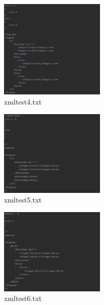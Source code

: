 \documentclass{article}
\begin{document}
\begin{multicols}{2}
					
					\begin{figure}[H]
					\centering
			 			\includegraphics[width=0.45\textwidth]{xmltest4.png}
			 			\centering
			  			\caption{xmltest4.txt}
			  			\label{fig:xmltest4}
					\end{figure}
					
					\begin{figure}[H]
					\centering
			 			\includegraphics[width=0.45\textwidth]{xmltest5.png}
			 			\centering
			  			\caption{xmltest5.txt}
			  			\label{fig:xmltest5}
					\end{figure}
					\begin{figure}[H]
					\centering
			 			\includegraphics[width=0.45\textwidth]{xmltest6.png}
			 			\centering
			  			\caption{xmltest6.txt}
			  			\label{fig:xmltest6}
					\end{figure}
					

\end{multicols}
\end{document}
